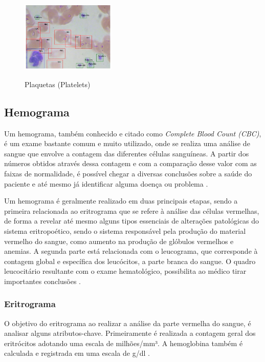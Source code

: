 \begin{figure}[!htb]
	\centering
	\caption{Plaquetas (Platelets)}
	\includegraphics[width=0.40\textwidth]{img/plt.jpg}
	\label{fig:plaquetas}
\end{figure}

\subsection{Hemograma}
Um hemograma, também conhecido e citado como \emph{Complete Blood Count (CBC)}, é um exame bastante comum e muito utilizado, onde se realiza uma análise de sangue que envolve a contagem das diferentes células sanguíneas. A partir dos números obtidos através dessa contagem e com a comparação desse valor com as faixas de normalidade, é possível chegar a diversas conclusões sobre a saúde do paciente e até mesmo já identificar alguma doença ou problema \cite{manualHematologia, abcOfCbc}.

Um hemograma é geralmente realizado em duas principais etapas, sendo a primeira relacionada ao eritrograma que se refere à análise das células vermelhas, de forma a revelar até mesmo alguns tipos essenciais de alterações patológicas do sistema eritropoético, sendo o sistema responsável pela produção do material vermelho do sangue, como aumento na produção de glóbulos vermelhos e anemias. A segunda parte está relacionada com o leucograma, que corresponde à contagem global e específica dos leucócitos, a parte branca do sangue. O quadro leucocitário resultante com o exame hematológico, possibilita ao médico tirar importantes conclusões \cite{manualHematologia, abcOfCbc}.

\subsubsection{Eritrograma}
O objetivo do eritrograma ao realizar a análise da parte vermelha do sangue, é analisar alguns atributos-chave. Primeiramente é realizada a contagem geral dos eritrócitos adotando uma escala de milhões/mm³. A hemoglobina também é calculada e registrada em uma escala de g/dl \cite{interpretacaoHemograma, manualHematologia}.


